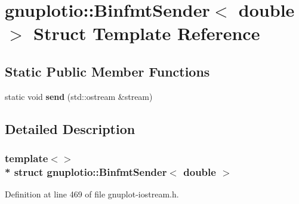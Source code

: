 \hypertarget{structgnuplotio_1_1_binfmt_sender_3_01double_01_4}{}\section{gnuplotio\+:\+:Binfmt\+Sender$<$ double $>$ Struct Template Reference}
\label{structgnuplotio_1_1_binfmt_sender_3_01double_01_4}
\subsection*{Static Public Member Functions}
\begin{DoxyCompactItemize}
\item 
static void {\bfseries send} (std\+::ostream \&stream)\hypertarget{structgnuplotio_1_1_binfmt_sender_3_01double_01_4_a455b75492a6a86398374d14a2bfc7238}{}\label{structgnuplotio_1_1_binfmt_sender_3_01double_01_4_a455b75492a6a86398374d14a2bfc7238}

\end{DoxyCompactItemize}


\subsection{Detailed Description}
\subsubsection*{template$<$$>$\\*
struct gnuplotio\+::\+Binfmt\+Sender$<$ double $>$}



Definition at line 469 of file gnuplot-\/iostream.\+h.

